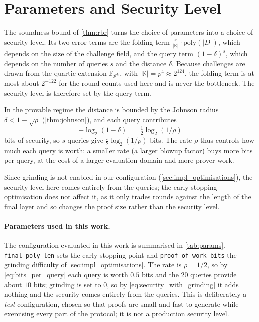\section{Parameters and Security Level}
\label{sec:impl_parameters}

The soundness bound of \cref{thm:rbr} turns the choice of parameters into
a choice of security level. Its two error terms are the folding term
$\tfrac{r}{|\mathbb{K}|}\cdot\mathrm{poly}(|D|)$, which depends on the
size of the challenge field, and the query term $(1-\delta)^{s}$, which
depends on the number of queries $s$ and the distance $\delta$. Because
challenges are drawn from the quartic extension $\mathbb{F}_{p^4}$, with
$|\mathbb{K}| = p^4 \approx 2^{124}$, the folding term is at most about
$2^{-122}$ for the round counts used here and is never the bottleneck.
The security level is therefore set by the query term.

In the provable regime the distance is bounded by the Johnson radius
$\delta < 1 - \sqrt{\rho}$ (\cref{thm:johnson}), and each query
contributes
%
\begin{equation}
\label{eq:bits_per_query}
-\log_2(1-\delta) \;=\; \tfrac{1}{2}\log_2(1/\rho)
\end{equation}
%
bits of security, so $s$ queries give $\tfrac{s}{2}\log_2(1/\rho)$ bits.
The rate $\rho$ thus controls how much each query is worth: a smaller
rate (a larger blowup factor) buys more bits per query, at the cost of a
larger evaluation domain and more prover work.

Since grinding is not enabled in our configuration
(\cref{sec:impl_optimisations}), the security level here comes entirely
from the queries; the early-stopping optimisation does not affect it, as
it only trades rounds against the length of the final layer and so changes
the proof size rather than the security level.

\paragraph{Parameters used in this work.}
The configuration evaluated in this work is summarised in \cref{tab:params}.
\texttt{final\_poly\_len} sets the early-stopping point and
\texttt{proof\_of\_work\_bits} the grinding difficulty of
\cref{sec:impl_optimisations}. The rate is $\rho = 1/2$, so by
\cref{eq:bits_per_query} each query is worth $0.5$ bits and the $20$
queries provide about $10$ bits; grinding is set to $0$, so by
\cref{eq:security_with_grinding} it adds nothing and the security comes entirely
from the queries. This is deliberately a \emph{test} configuration, chosen so
that proofs are small and fast to generate while exercising every part of the
protocol; it is not a production security level.

